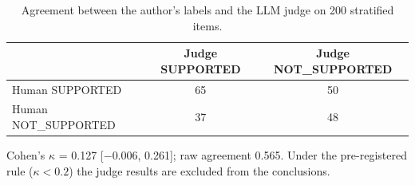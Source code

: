 \begin{table}[t]
\centering
\small
\caption{Agreement between the author's labels and the LLM judge on 200 stratified items.}
\label{tab:judge}
\begin{tabular}{lcc}
\toprule
& Judge SUPPORTED & Judge NOT\_SUPPORTED \\
\midrule
Human SUPPORTED & 65 & 50 \\
Human NOT\_SUPPORTED & 37 & 48 \\
\bottomrule
\end{tabular}
\par\smallskip\parbox{\linewidth}{\footnotesize Cohen's $\kappa$ = 0.127 [$-$0.006, 0.261]; raw agreement 0.565. Under the pre-registered rule ($\kappa<0.2$) the judge results are excluded from the conclusions.}
\end{table}
